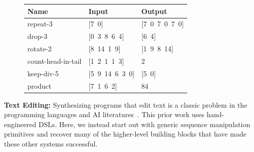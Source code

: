 \documentclass{article}
\newcommand{\code}[1]{{\footnotesize\texttt{#1}}}
\newcommand{\probability}{\mathds{P}} %
\begin{document}
\begin{figure}[b]\centering
\vspace{-0.5cm}  \begin{tabular}{lll}
    \toprule
    Name & Input & Output \\\midrule
    repeat-3 & [7\, 0] & [7\, 0\, 7\, 0\, 7\, 0] \\
    drop-3 & [0\, 3\, 8\, 6\, 4] & [6\, 4] \\
    rotate-2 & [8\, 14\, 1\, 9] & [1\, 9\, 8\, 14] \\
    count-head-in-tail & [1\, 2\, 1\, 1\, 3] & 2 \\
    keep-div-5 & [5\, 9\, 14\, 6\, 3\, 0] & [5\, 0] \\
    product & [7\, 1\, 6\, 2] & 84 \\
    \bottomrule
  \end{tabular}
  \label{listExamples}\vspace{-0.5cm}
\end{figure}

\textbf{Text Editing:} Synthesizing programs that edit text is a classic problem in the
programming languages and AI literatures~\cite{gulwani2011automating,lau2001programming}.
This prior work uses hand-engineered DSLs.
Here, we instead start out with generic sequence manipulation
primitives and recover many of the higher-level building blocks that 
have made these other systems successful.
\end{document}

